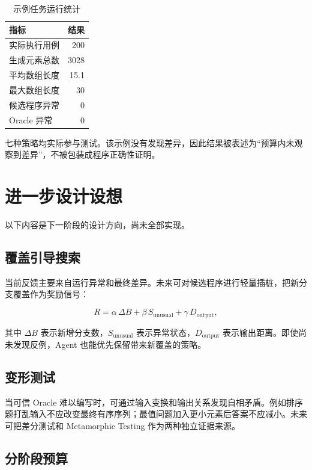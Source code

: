 \documentclass[10pt,a4paper]{ctexart}
\begin{document}
\begin{table}[htbp]
\centering
{}
\begin{tabular}{lr}
\toprule
指标 & 结果 \\
\midrule
实际执行用例 & 200 \\
生成元素总数 & 3028 \\
平均数组长度 & 15.1 \\
最大数组长度 & 30 \\
候选程序异常 & 0 \\
Oracle 异常 & 0 \\
\bottomrule
\end{tabular}
\caption{示例任务运行统计}
\end{table}

七种策略均实际参与测试。该示例没有发现差异，因此结果被表述为“预算内未观察到差异”，不被包装成程序正确性证明。

\section{进一步设计设想}

以下内容是下一阶段的设计方向，尚未全部实现。

\subsection{覆盖引导搜索}

当前反馈主要来自运行异常和最终差异。未来可对候选程序进行轻量插桩，把新分支覆盖作为奖励信号：

\[
R=\alpha\,\Delta B+\beta\,S_{\mathrm{unusual}}+\gamma\,D_{\mathrm{output}},
\]

其中 $\Delta B$ 表示新增分支数，$S_{\mathrm{unusual}}$ 表示异常状态，$D_{\mathrm{output}}$ 表示输出距离。即使尚未发现反例，Agent 也能优先保留带来新覆盖的策略。

\subsection{变形测试}

当可信 Oracle 难以编写时，可通过输入变换和输出关系发现自相矛盾。例如排序题打乱输入不应改变最终有序序列；最值问题加入更小元素后答案不应减小。未来可把差分测试和 Metamorphic Testing 作为两种独立证据来源。

\subsection{分阶段预算}
\end{document}
